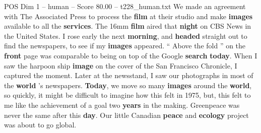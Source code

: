 \begin{textsample}{POS Dim 1 – human – Score 80.00 – t228\_human.txt}
We made an agreement with The Associated Press to process the \textbf{film} at their studio and make \textbf{images} available to all the \textbf{services}.
The 16mm \textbf{film} aired that \textbf{night} on CBS News in the United States.
I rose early the next \textbf{morning}, and \textbf{headed} straight out to find the newspapers, to see if my \textbf{images} appeared. “ Above the fold ” on the \textbf{front} page was comparable to being on top of the Google \textbf{search} \textbf{today}.
When I saw the harpoon ship \textbf{image} on the cover of the San Francisco Chronicle, I captured the moment.
Later at the newsstand, I saw our photographs in most of the \textbf{world} ’s newspapers. \textbf{Today}, we move so many \textbf{images} around the \textbf{world}, so quickly, it might be difficult to imagine how this felt in 1975, but, this felt to me like the achievement of a goal two \textbf{years} in the making.
Greenpeace was never the same after this \textbf{day}.
Our little Canadian \textbf{peace} and \textbf{ecology} project was about to go global.

\end{textsample}
